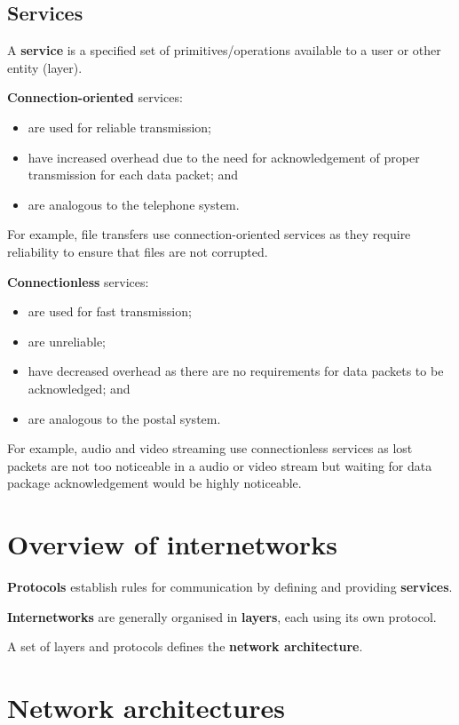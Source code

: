 \documentclass[a4paper]{systems-software}
\begin{document}
\subsection*{Services}

A \textbf{service} is a specified set of primitives/operations available to a user or other entity (layer).

\textbf{Connection-oriented} services:
\begin{itemize}
	\item are used for reliable transmission;
	\item have increased overhead due to the need for acknowledgement of proper transmission for each data packet; and
	\item are analogous to the telephone system.
\end{itemize}
For example, file transfers use connection-oriented services as they require reliability to ensure that files are not corrupted.

\textbf{Connectionless} services:
\begin{itemize}
	\item are used for fast transmission;
	\item are unreliable;
	\item have decreased overhead as there are no requirements for data packets to be acknowledged; and
	\item are analogous to the postal system.
\end{itemize}
For example, audio and video streaming use connectionless services as lost packets are not too noticeable in a audio or video stream but waiting for data package acknowledgement would be highly noticeable.


\section*{Overview of internetworks}

\textbf{Protocols} establish rules for communication by defining and providing \textbf{services}.

\textbf{Internetworks} are generally organised in \textbf{layers}, each using its own protocol.

A set of layers and protocols defines the \textbf{network architecture}.


\section{Network architectures}
\end{document}
